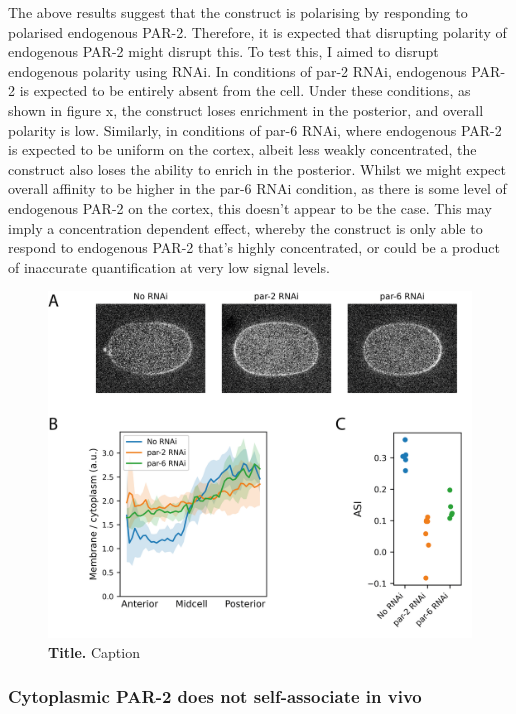\documentclass[12pt]{"article"}
\newcommand{\mycaption}[2]{\caption[#1]{\textbf{#1.} #2}}
\begin{document}
The above results suggest that the construct is polarising by responding to polarised endogenous PAR-2. Therefore, it is expected that disrupting polarity of endogenous PAR-2 might disrupt this. To test this, I aimed to disrupt endogenous polarity using RNAi. In conditions of par-2 RNAi, endogenous PAR-2 is expected to be entirely absent from the cell. Under these conditions, as shown in figure x, the construct loses enrichment in the posterior, and overall polarity is low. Similarly, in conditions of par-6 RNAi, where endogenous PAR-2 is expected to be uniform on the cortex, albeit less weakly concentrated, the construct also loses the ability to enrich in the posterior. Whilst we might expect overall affinity to be higher in the par-6 RNAi condition, as there is some level of endogenous PAR-2 on the cortex, this doesn’t appear to be the case. This may imply a concentration dependent effect, whereby the construct is only able to respond to endogenous PAR-2 that’s highly concentrated, or could be a product of inaccurate quantification at very low signal levels.\\

\begin{figure}[!h]
\includegraphics[scale=1]{ph_ring_rnai}
\setlength{\abovecaptionskip}{20pt}
\centering
\mycaption{Title}{Caption}
\label{fig:ph_ring_rnai}
\end{figure}


\subsubsection{Cytoplasmic PAR-2  does not self-associate in vivo}
\end{document}
